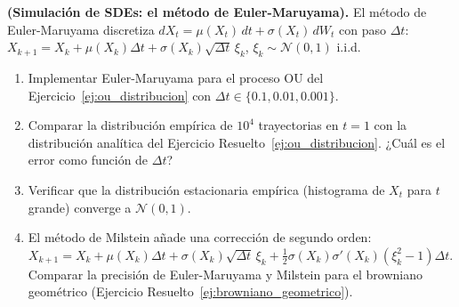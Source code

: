 \begin{ejercicio}
\textbf{(Simulación de SDEs: el método de Euler-Maruyama).}
El método de Euler-Maruyama discretiza $dX_t = \mu(X_t)\,dt + \sigma(X_t)\,dW_t$
con paso $\Delta t$:
$X_{k+1} = X_k + \mu(X_k)\Delta t + \sigma(X_k)\sqrt{\Delta t}\,\xi_k$,
$\xi_k \sim \mathcal{N}(0,1)$ i.i.d.
\begin{enumerate}[label=(\alph*)]
  \item Implementar Euler-Maruyama para el proceso OU del
        Ejercicio~\ref{ej:ou_distribucion} con $\Delta t \in \{0.1, 0.01, 0.001\}$.
  \item Comparar la distribución empírica de $10^4$ trayectorias en $t = 1$
        con la distribución analítica del Ejercicio Resuelto~\ref{ej:ou_distribucion}.
        ¿Cuál es el error como función de $\Delta t$?
  \item Verificar que la distribución estacionaria empírica (histograma de
        $X_t$ para $t$ grande) converge a $\mathcal{N}(0,1)$.
  \item El método de Milstein añade una corrección de segundo orden:
        $X_{k+1} = X_k + \mu(X_k)\Delta t + \sigma(X_k)\sqrt{\Delta t}\,\xi_k
        + \frac{1}{2}\sigma(X_k)\sigma'(X_k)(\xi_k^2-1)\Delta t$.
        Comparar la precisión de Euler-Maruyama y Milstein para el browniano
        geométrico (Ejercicio Resuelto~\ref{ej:browniano_geometrico}).
\end{enumerate}
\end{ejercicio}

\printbibliography[heading=subbibliography]